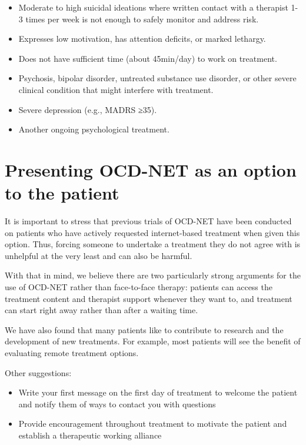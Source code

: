 \documentclass[]{book}
\providecommand{\tightlist}{%
  \setlength{\itemsep}{0pt}\setlength{\parskip}{0pt}}
\begin{document}
\begin{itemize}
\tightlist
\item
  Moderate to high suicidal ideations where written contact with a therapist 1-3 times per week is not enough to safely monitor and address risk.\\
\item
  Expresses low motivation, has attention deficits, or marked lethargy.\\
\item
  Does not have sufficient time (about 45min/day) to work on treatment.\\
\item
  Psychosis, bipolar disorder, untreated substance use disorder, or other severe clinical condition that might interfere with treatment.\\
\item
  Severe depression (e.g., MADRS ≥35).\\
\item
  Another ongoing psychological treatment.
\end{itemize}

\hypertarget{presenting-ocd-net-as-an-option-to-the-patient}{%
\section{Presenting OCD-NET as an option to the patient}\label{presenting-ocd-net-as-an-option-to-the-patient}}

It is important to stress that previous trials of OCD-NET have been conducted on patients who have actively requested internet-based treatment when given this option. Thus, forcing someone to undertake a treatment they do not agree with is unhelpful at the very least and can also be harmful.

With that in mind, we believe there are two particularly strong arguments for the use of OCD-NET rather than face-to-face therapy: patients can access the treatment content and therapist support whenever they want to, and treatment can start right away rather than after a waiting time.

We have also found that many patients like to contribute to research and the development of new treatments. For example, most patients will see the benefit of evaluating remote treatment options.

Other suggestions:

\begin{itemize}
\tightlist
\item
  Write your first message on the first day of treatment to welcome the patient and notify them of ways to contact you with questions
\item
  Provide encouragement throughout treatment to motivate the patient and establish a therapeutic working alliance
\end{itemize}
\end{document}
